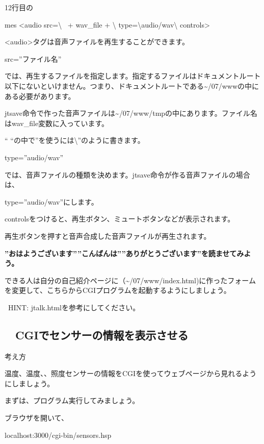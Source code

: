 12行目の

mes {\textquotedbl}{\textless}audio src={\textbackslash}{\textquotedbl}{\textquotedbl} \ + wav\_file +
{\textquotedbl}{\textbackslash}{\textquotedbl}
type={\textbackslash}{\textquotedbl}audio/wav{\textbackslash}{\textquotedbl} controls{\textgreater}{\textquotedbl}

	{\textless}audio{\textgreater}タグは音声ファイルを再生することができます。

src=”ファイル名”

では、再生するファイルを指定します。指定するファイルはドキュメントルート以下にないといけません。つまり、ドキュメントルートである{\textasciitilde}/07/wwwの中にある必要があります。

jtsave命令で作った音声ファイルは{\textasciitilde}/07/www/tmpの中にあります。ファイル名はwav\_file変数に入っています。

“
“の中で”を使うには{\textbackslash}”のように書きます。

type=”audio/wav”

では、音声ファイルの種類を決めます。jtsave命令が作る音声ファイルの場合は、

type=”audio/wav”にします。

controlsをつけると、再生ボタン、ミュートボタンなどが表示されます。

再生ボタンを押すと音声合成した音声ファイルが再生されます。

\clearpage
{}\theQuestion\label{Q:Jtalk}
{\bfseries ”おはようございます””こんばんは””ありがとうございます”を読ませてみよう。}

できる人は自分の自己紹介ページに（{\textasciitilde}/07/www/index.html)に作ったフォームを変更して、こちらからCGIプログラムを起動するようにしましょう。

\ HINT: jtalk.htmlを参考にしてください。

\clearpage
\subsection*{\theExercise　CGIでセンサーの情報を表示させる}
\addtocounter{Exercise}{-1}\label{E:Sensors}
\noindent 考え方

温度、温度、、照度センサーの情報をCGIを使ってウェブページから見れるようにしましょう。

まずは、プログラム実行してみましょう。

ブラウザを開いて、

localhost:3000/cgi-bin/sensors.hsp

